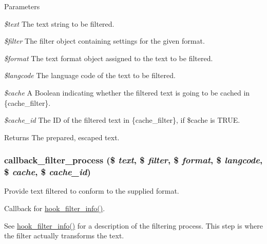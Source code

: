 \begin{DoxyParams}{Parameters}
\item[{\em \$text}]The text string to be filtered. \item[{\em \$filter}]The filter object containing settings for the given format. \item[{\em \$format}]The text format object assigned to the text to be filtered. \item[{\em \$langcode}]The language code of the text to be filtered. \item[{\em \$cache}]A Boolean indicating whether the filtered text is going to be cached in \{cache\_\-filter\}. \item[{\em \$cache\_\-id}]The ID of the filtered text in \{cache\_\-filter\}, if \$cache is TRUE.\end{DoxyParams}
\begin{DoxyReturn}{Returns}
The prepared, escaped text. 
\end{DoxyReturn}
\hypertarget{group__callbacks_ga5f82accd878d144a22ea2dfec253f91d}{
\subsubsection[{callback\_\-filter\_\-process}]{\setlength{\rightskip}{0pt plus 5cm}callback\_\-filter\_\-process (\$ {\em text}, \/  \$ {\em filter}, \/  \$ {\em format}, \/  \$ {\em langcode}, \/  \$ {\em cache}, \/  \$ {\em cache\_\-id})}}
\label{group__callbacks_ga5f82accd878d144a22ea2dfec253f91d}
Provide text filtered to conform to the supplied format.

Callback for \hyperlink{group__hooks_gaf2a2f2a46589420df896a0d42247f15a}{hook\_\-filter\_\-info()}.

See \hyperlink{group__hooks_gaf2a2f2a46589420df896a0d42247f15a}{hook\_\-filter\_\-info()} for a description of the filtering process. This step is where the filter actually transforms the text.


